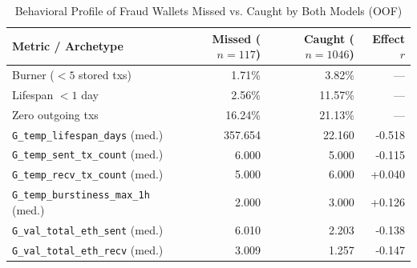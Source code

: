 \begin{table}[!htbp]
\centering
\caption{Behavioral Profile of Fraud Wallets Missed vs. Caught by Both Models (OOF)}
\label{tab:evasion}
\footnotesize
\begin{tabularx}{\linewidth}{X r r r}
\toprule
\textbf{Metric / Archetype} & \textbf{Missed ($n=117$)} & \textbf{Caught ($n=1046$)} & \textbf{Effect $r$} \\
\midrule
Burner ($<5$ stored txs) & 1.71\% & 3.82\% & --- \\
Lifespan $<1$ day & 2.56\% & 11.57\% & --- \\
Zero outgoing txs & 16.24\% & 21.13\% & --- \\
\midrule
\texttt{G\_temp\_lifespan\_days} (med.) & 357.654 & 22.160 & -0.518 \\
\texttt{G\_temp\_sent\_tx\_count} (med.) & 6.000 & 5.000 & -0.115 \\
\texttt{G\_temp\_recv\_tx\_count} (med.) & 5.000 & 6.000 & +0.040 \\
\texttt{G\_temp\_burstiness\_max\_1h} (med.) & 2.000 & 3.000 & +0.126 \\
\texttt{G\_val\_total\_eth\_sent} (med.) & 6.010 & 2.203 & -0.138 \\
\texttt{G\_val\_total\_eth\_recv} (med.) & 3.009 & 1.257 & -0.147 \\
\bottomrule
\end{tabularx}
\end{table}